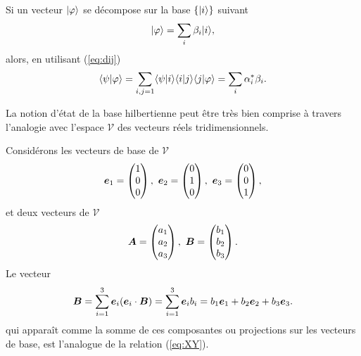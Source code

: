 Si un vecteur $\vert\varphi\rangle$ se décompose sur la base $\{\vert i\rangle\}$ suivant
\begin{equation}
\vert\varphi\rangle =\sum_{i}\beta_{i}\vert i\rangle,
\end{equation}
alors, en utilisant (\ref{eq:dij})%
\begin{equation}
\langle\psi\vert\varphi\rangle =\sum_{i,j=1}\langle\psi\vert i\rangle\langle i\vert
j\rangle\langle j\vert\varphi\rangle=\sum_{i}\alpha_{i}^{\ast}\beta_{i}.
\label{eq:XY2}
\end{equation}

La notion d'état de la base hilbertienne peut être très bien comprise à
travers l'analogie avec l'espace $\mathcal{V}$ des vecteurs réels
tridimensionnels.

Considérons les vecteurs de base de $\mathcal{V}$%
\begin{equation}
\boldsymbol{e}_1=\begin{pmatrix}1\\0\\0\end{pmatrix},\ \boldsymbol{e}_2=\begin{pmatrix}
0\\1\\0\end{pmatrix},\ \boldsymbol{e}_{3}=\begin{pmatrix}0\\0\\1\end{pmatrix},
\end{equation}
et deux vecteurs de $\mathcal{V}$%
\begin{equation}
\boldsymbol{A}=\begin{pmatrix}
a_1\\
a_2\\
a_{3}\end{pmatrix},\ \boldsymbol{B}=\begin{pmatrix}
b_1\\
b_2\\
b_{3}\end{pmatrix}.
\end{equation}
Le vecteur
\begin{equation}
\bls{B}=\sum_{i=1}^{3}\bls{e}_{i}(\bls{e}_{i}
\cdot\bls{B})=\sum_{i=1}^{3}\bls{e}_{i}b_{i}=
b_1\bls{e}_1+b_2\bls{e}_2+b_{3}\bls{e}_{3}.
\label{eq:B}%
\end{equation}
qui apparaît comme la somme de ces composantes ou projections sur les vecteurs
de base, est l'analogue de la relation (\ref{eq:XY}).

